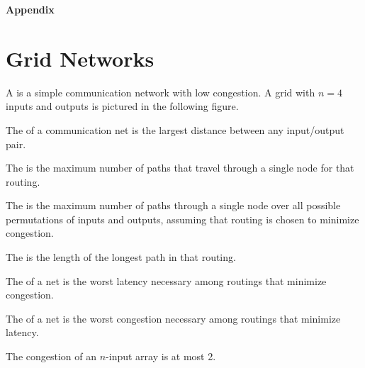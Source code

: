 \documentclass[quiz]{mcs}
\begin{document}
\examspace

\examspace

\examspace


\iffalse


\examspace

\begin{center}
\LARGE \textbf{Appendix}
\end{center}

\iffalse
\section{Grid Networks}

A  is a simple communication network with low congestion.  A
grid with $n = 4$ inputs and outputs is pictured in the following figure.


The  of a communication net is the largest distance between
any input/output pair.

The  is the maximum number of paths that
travel through a single node for that routing.

The  is the maximum number of paths through a
single node over all possible permutations of inputs and outputs, assuming
that routing is chosen to minimize congestion.

The  is the length of the longest path in that
routing.
 
The  of a net is the worst
latency necessary among routings that minimize congestion.

The  of a net is the worst
congestion necessary among routings that minimize latency.

\begin{theorem*} 
The congestion of an $n$-input array is at most 2. 
\end{theorem*} 
 
\end{document}
